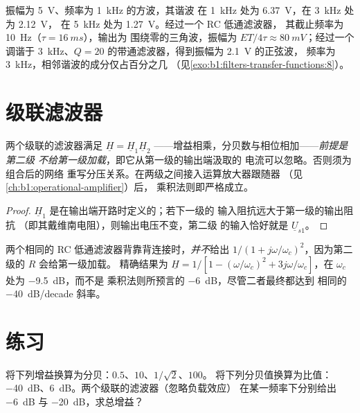 \begin{example}[数值]\label{ex:b1:filters-transfer-functions:numbers}
振幅为 \qty{5}{V}、频率为 \qty{1}{kHz} 的方波，其谐波
在 \qty{1}{kHz} 处为 \qty{6.37}{V}，在 \qty{3}{kHz} 处为 \qty{2.12}{V}，
在 \qty{5}{kHz} 处为 \qty{1.27}{V}。经过一个 RC 低通滤波器，
其截止频率为 \qty{10}{Hz}（$\tau = \qty{16}{ms}$），输出为
围绕零的三角波，振幅为 $ET/4\tau \approx \qty{80}{mV}$；经过一个
调谐于 \qty{3}{kHz}、$Q = 20$ 的带通滤波器，得到振幅为 \qty{2.1}{V} 的正弦波，
频率为 \qty{3}{kHz}，相邻谐波的成分仅占百分之几
（见\cref{exo:b1:filters-transfer-functions:8}）。
\end{example}

\section{级联滤波器}

\begin{proposition}[级联与负载效应]\label{prop:b1:filters-transfer-functions:cascade}
两个级联的滤波器满足 $\underline H = \underline H_1\underline H_2$
——增益相乘，分贝数与相位相加——\emph{前提是第二级
不给第一级加载}，即它从第一级的输出端汲取的
电流可以忽略。否则须为组合后的网络
重写分压关系。在两级之间接入运算放大器跟随器
（见\cref{ch:b1:operational-amplifier}）后，
乘积法则即严格成立。
\end{proposition}

\begin{proof}
$\underline H_1$ 是在输出端开路时定义的；若下一级的
输入阻抗远大于第一级的输出阻抗
（即其戴维南电阻），则输出电压不变，第二级
的输入恰好就是 $\underline U_{s1}$。
\end{proof}

\begin{example}[两级 RC 电路]\label{ex:b1:filters-transfer-functions:tworc}
两个相同的 RC 低通滤波器背靠背连接时，\emph{并不}给出
$1/(1 + j\omega/\omega_c)^2$，因为第二级的 $R$ 会给第一级加载。
精确结果为 $\underline H = 1/[1 - (\omega/\omega_c)^2 +
3j\omega/\omega_c]$，在 $\omega_c$ 处为 \qty{-9.5}{dB}，而不是
乘积法则所预言的 \qty{-6}{dB}，尽管二者最终都达到
相同的 \qty{-40}{dB/decade} 斜率。
\end{example}

\section{练习}

\begin{exercise}[$\star$]\label{exo:b1:filters-transfer-functions:1}
将下列增益换算为分贝：$0.5$、$10$、$1/\sqrt2$、$100$。
将下列分贝值换算为比值：\qty{-40}{dB}、\qty{+6}{dB}。两个级联的滤波器（忽略负载效应）
在某一频率下分别给出 \qty{-6}{dB} 与 \qty{-20}{dB}，求总增益？
\end{exercise}


